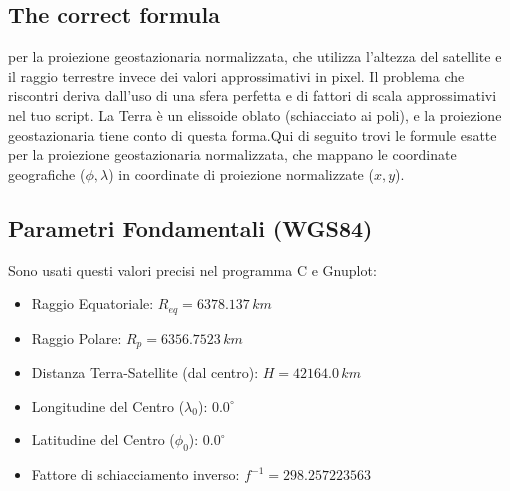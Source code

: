 \documentclass[a4paper,14pt]{article}
\begin{document}
\subsection{The correct formula} per la proiezione geostazionaria normalizzata, che utilizza l'altezza del satellite e il raggio terrestre invece dei valori approssimativi in pixel.
Il problema che riscontri deriva dall'uso di una sfera perfetta e di fattori di scala approssimativi nel tuo script. La Terra è un elissoide oblato (schiacciato ai poli), e la proiezione geostazionaria tiene conto di questa forma.Qui di seguito trovi le formule esatte per la proiezione geostazionaria normalizzata, che mappano le coordinate geografiche (\(\phi ,\lambda \)) in coordinate di proiezione normalizzate (\(x,y\)).
\subsection{Parametri Fondamentali (WGS84)}
Sono usati questi valori precisi nel programma C e Gnuplot:
\begin{itemize}
\item Raggio Equatoriale: \(R_{eq}=6378.137\,km \)
\item Raggio Polare: \(R_{p}=6356.7523\,km\)
\item Distanza Terra-Satellite (dal centro): \(H=42164.0\,km\)
\item Longitudine del Centro (\(\lambda _{0}\)): \(0.0^{\circ }\)
\item Latitudine del Centro (\(\phi _{0}\)): \(0.0^{\circ }\)
\item Fattore di schiacciamento inverso: \(f^{-1}=298.257223563\)
\end{itemize}
\end{document}
